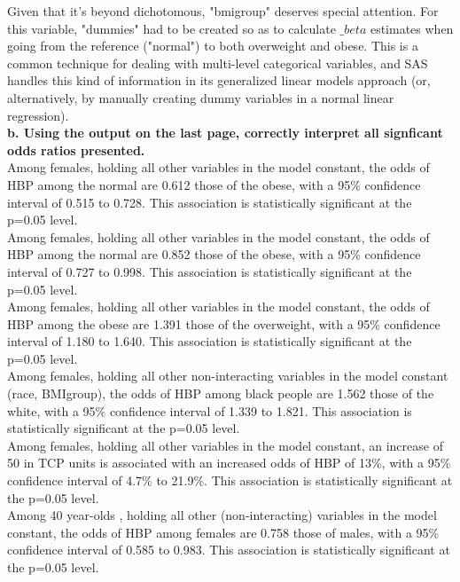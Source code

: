 \documentclass{article}
\begin{document}
Given that it's beyond dichotomous, "bmigroup" deserves special attention.  For this variable, "dummies" had to be created so as to calculate $\_beta$ estimates when going from the reference ("normal") to both overweight and obese. This is a common technique for dealing with multi-level categorical variables, and SAS handles this kind of information in its generalized linear models approach (or, alternatively, by manually creating dummy variables in a normal linear regression). \\


\noindent \textbf{b. Using the output on the last page, correctly interpret all signficant odds ratios presented.} \\

\noindent Among females, holding all other variables in the model constant, the odds of HBP among the normal are 0.612 those of the obese, with a 95\% confidence interval of 0.515 to 0.728. This association is statistically significant at the p=0.05 level. \\

\noindent Among females, holding all other variables in the model constant, the odds of HBP among the normal are 0.852 those of the obese, with a 95\% confidence interval of 0.727 to 0.998. This association is statistically significant at the p=0.05 level. \\

\noindent Among females, holding all other variables in the model constant, the odds of HBP among the obese are 1.391 those of the overweight, with a 95\% confidence interval of 1.180 to 1.640. This association is statistically significant at the p=0.05 level.  \\

\noindent Among females, holding all other non-interacting variables in the model constant (race, BMIgroup), the odds of HBP among black people are 1.562 those of the white, with a 95\% confidence interval of 1.339 to 1.821. This association is statistically significant at the p=0.05 level.\\

\noindent Among females, holding all other variables in the model constant, an increase of 50 in TCP units is associated with an increased odds of HBP of 13\%, with a 95\% confidence interval of 4.7\% to 21.9\%. This association is statistically significant at the p=0.05 level.\\

\noindent Among 40 year-olds , holding all other (non-interacting) variables in the model constant, the odds of HBP among females are 0.758 those of males, with a 95\% confidence interval of 0.585 to 0.983. This association is statistically significant at the p=0.05 level.\\
\end{document}
